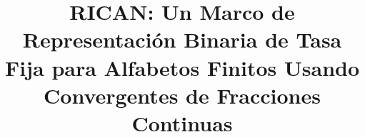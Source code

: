 \documentclass[onecolumn]{IEEEtran}
\begin{document}

\title{
RICAN: Un Marco de Representación Binaria de Tasa Fija
para Alfabetos Finitos Usando Convergentes de Fracciones Continuas
}

\author{
}

\maketitle

\end{document}
